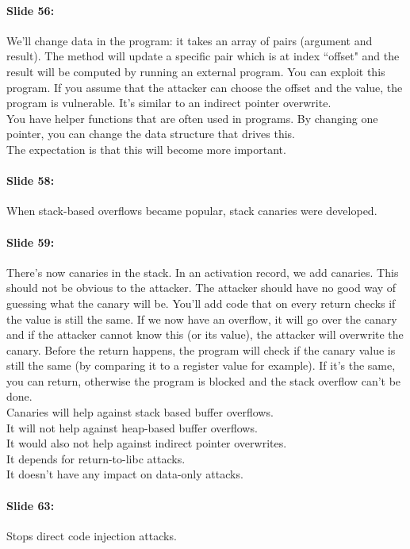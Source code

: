 \documentclass[10pt,a4paper]{report}
\begin{document}
\paragraph{Slide 56:} We'll change data in the program: it takes an array of pairs (argument and result). The method will update a specific pair which is at index ``offset" and the result will be computed by running an external program. You can exploit this program. If you assume that the attacker can choose the offset and the value, the program is vulnerable. It's similar to an indirect pointer overwrite.\\
You have helper functions that are often used in programs. By changing one pointer, you can change the data structure that drives this.\\
The expectation is that this will become more important.

\paragraph{Slide 58:} When stack-based overflows became popular, stack canaries were developed.

\paragraph{Slide 59:} There's now canaries in the stack. In an activation record, we add canaries. This should not be obvious to the attacker. The attacker should have no good way of guessing what the canary will be. You'll add code that on every return checks if the value is still the same. If we now have an overflow, it will go over the canary and if the attacker cannot know this (or its value), the attacker will overwrite the canary. Before the return happens, the program will check if the canary value is still the same (by comparing it to a register value for example). If it's the same, you can return, otherwise the program is blocked and the stack overflow can't be done.\\
Canaries will help against stack based buffer overflows.\\
It will not help against heap-based buffer overflows. \\
It would also not help against indirect pointer overwrites. \\
It depends for return-to-libc attacks. \\
It doesn't have any impact on data-only attacks.

\paragraph{Slide 63:} Stops direct code injection attacks. 
\end{document}

